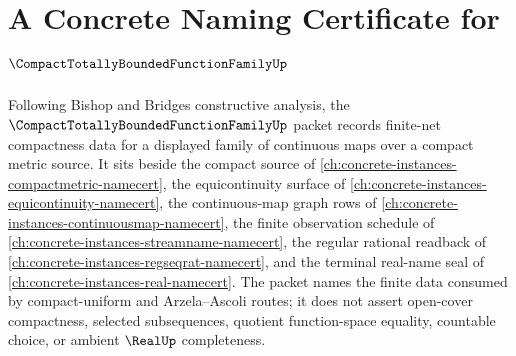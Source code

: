 \chapter{A Concrete Naming Certificate for $\CompactTotallyBoundedFunctionFamilyUp$}
\label{ch:concrete-instances-compact-totally-bounded-function-family-namecert}

Following Bishop and Bridges constructive analysis, the $\CompactTotallyBoundedFunctionFamilyUp$ packet records finite-net compactness data for a displayed family of continuous maps over a compact metric source. It sits beside the compact source of \autoref{ch:concrete-instances-compactmetric-namecert}, the equicontinuity surface of \autoref{ch:concrete-instances-equicontinuity-namecert}, the continuous-map graph rows of \autoref{ch:concrete-instances-continuousmap-namecert}, the finite observation schedule of \autoref{ch:concrete-instances-streamname-namecert}, the regular rational readback of \autoref{ch:concrete-instances-regseqrat-namecert}, and the terminal real-name seal of \autoref{ch:concrete-instances-real-namecert}. The packet names the finite data consumed by compact-uniform and Arzela--Ascoli routes; it does not assert open-cover compactness, selected subsequences, quotient function-space equality, countable choice, or ambient $\RealUp$ completeness.




